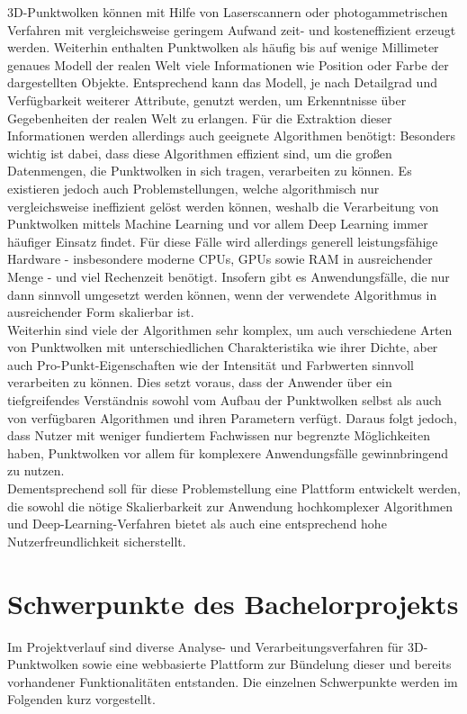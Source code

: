 3D-Punktwolken können mit Hilfe von Laserscannern oder photogammetrischen Verfahren mit vergleichsweise geringem Aufwand zeit- und kosteneffizient erzeugt werden. Weiterhin enthalten Punktwolken als häufig bis auf wenige Millimeter genaues Modell der realen Welt viele Informationen wie Position oder Farbe der dargestellten Objekte. Entsprechend kann das Modell, je nach Detailgrad und Verfügbarkeit weiterer Attribute, genutzt werden, um Erkenntnisse über Gegebenheiten der realen Welt zu erlangen. Für die Extraktion dieser Informationen werden allerdings auch geeignete Algorithmen benötigt: Besonders wichtig ist dabei, dass diese Algorithmen effizient sind, um die großen Datenmengen, die Punktwolken in sich tragen, verarbeiten zu können. Es existieren jedoch auch Problemstellungen, welche algorithmisch nur vergleichsweise ineffizient gelöst werden können, weshalb die Verarbeitung von Punktwolken mittels Machine Learning und vor allem Deep Learning immer häufiger Einsatz findet. Für diese Fälle wird allerdings generell leistungsfähige Hardware - insbesondere moderne CPUs, GPUs sowie RAM in ausreichender Menge - und viel Rechenzeit benötigt. Insofern gibt es Anwendungsfälle, die nur dann sinnvoll umgesetzt werden können, wenn der verwendete Algorithmus in ausreichender Form skalierbar ist. \\
Weiterhin sind viele der Algorithmen sehr komplex, um auch verschiedene Arten von Punktwolken mit unterschiedlichen Charakteristika wie ihrer Dichte, aber auch Pro-Punkt-Eigenschaften wie der Intensität und Farbwerten sinnvoll verarbeiten zu können. Dies setzt voraus, dass der Anwender über ein tiefgreifendes Verständnis sowohl vom Aufbau der Punktwolken selbst als auch von verfügbaren Algorithmen und ihren Parametern verfügt. Daraus folgt jedoch, dass Nutzer mit weniger fundiertem Fachwissen nur begrenzte Möglichkeiten haben, Punktwolken vor allem für komplexere Anwendungsfälle gewinnbringend zu nutzen. \\
Dementsprechend soll für diese Problemstellung eine Plattform entwickelt werden, die sowohl die nötige Skalierbarkeit zur Anwendung hochkomplexer Algorithmen und Deep-Learning-Verfahren bietet als auch eine entsprechend hohe Nutzerfreundlichkeit sicherstellt.

\section{Schwerpunkte des Bachelorprojekts}

Im Projektverlauf sind diverse Analyse- und Verarbeitungsverfahren für 3D-Punktwolken sowie eine webbasierte Plattform zur Bündelung dieser und bereits vorhandener Funktionalitäten entstanden. Die einzelnen Schwerpunkte werden im Folgenden kurz vorgestellt.

